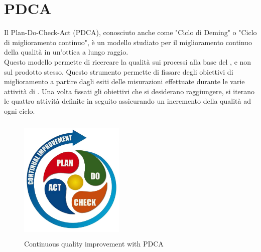\documentclass[PdQ.tex]{subfiles}
\begin{document}
\hypertarget{PDCA}{\section{PDCA}}

Il Plan-Do-Check-Act (PDCA), conosciuto anche come "Ciclo di Deming" o "Ciclo di miglioramento continuo", è un modello studiato per il miglioramento continuo della qualità in un’ottica a lungo raggio.\\ 
Questo modello permette di ricercare la qualità sui processi alla base del , e non sul prodotto stesso.
Questo strumento permette di fissare degli obiettivi di miglioramento a partire dagli esiti delle misurazioni effettuate durante le varie attività di .
Una volta fissati gli obiettivi che si desiderano raggiungere, si iterano le quattro attività definite in seguito assicurando un incremento della qualità ad ogni ciclo.
\begin{figure}[htbp]
	\centering
	\includegraphics[height=6cm, width=5cm]{pdca.jpg}
	\caption{Continuous quality improvement with PDCA}\label{fig:pdca}
\end{figure}
\end{document}
